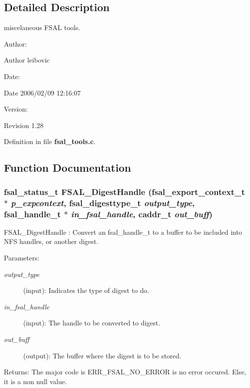 \subsection{Detailed Description}
miscelaneous FSAL tools. 

\begin{Desc}
\item[Author:]\end{Desc}
\begin{Desc}
\item[Author]leibovic \end{Desc}
\begin{Desc}
\item[Date:]\end{Desc}
\begin{Desc}
\item[Date]2006/02/09 12:16:07 \end{Desc}
\begin{Desc}
\item[Version:]\end{Desc}
\begin{Desc}
\item[Revision]1.28 \end{Desc}


Definition in file {\bf fsal\_\-tools.c}.

\subsection{Function Documentation}
\subsubsection[{FSAL\_\-DigestHandle}]{\setlength{\rightskip}{0pt plus 5cm}fsal\_\-status\_\-t FSAL\_\-DigestHandle (fsal\_\-export\_\-context\_\-t $\ast$ {\em p\_\-expcontext}, \/  fsal\_\-digesttype\_\-t {\em output\_\-type}, \/  fsal\_\-handle\_\-t $\ast$ {\em in\_\-fsal\_\-handle}, \/  caddr\_\-t {\em out\_\-buff})}\label{fsal__tools_8c_b02934f69a3ddfb023c4ee861a2f8ca4}


FSAL\_\-DigestHandle : Convert an fsal\_\-handle\_\-t to a buffer to be included into NFS handles, or another digest.

\begin{Desc}
\item[Parameters:]
\begin{description}
\item[{\em output\_\-type}](input): Indicates the type of digest to do. \item[{\em in\_\-fsal\_\-handle}](input): The handle to be converted to digest. \item[{\em out\_\-buff}](output): The buffer where the digest is to be stored.\end{description}
\end{Desc}
\begin{Desc}
\item[Returns:]The major code is ERR\_\-FSAL\_\-NO\_\-ERROR is no error occured. Else, it is a non null value. \end{Desc}


